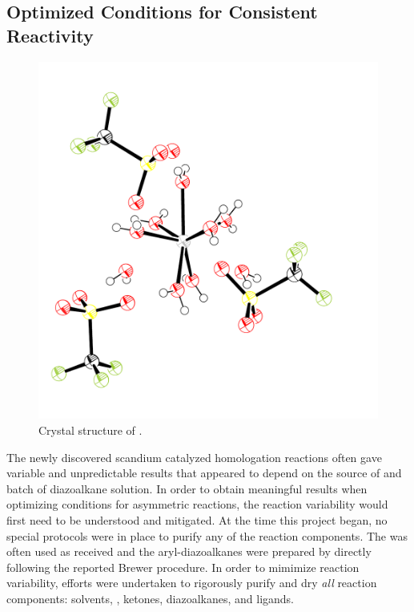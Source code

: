 \subsection{Optimized Conditions for Consistent Reactivity}

\begin{figure}
  \centering
  \vspace{-40pt}
  \includegraphics[scale=0.3]{chp_asymmetric/images/scandiumhydratedortep}
  \caption{Crystal structure of .}
  \vspace{-25pt}
  \label{fig:asscandiumhydrated}
  \end{figure}
The newly discovered scandium catalyzed homologation reactions often gave variable and
unpredictable results that appeared to depend on the source of  and batch of
diazoalkane solution.
In order to obtain meaningful results when optimizing conditions for asymmetric reactions, the reaction
variability would first need to be understood and mitigated. At the time this project began,
no special protocols were in place to purify any of the reaction components. The  was
often used as received and the aryl-diazoalkanes were prepared by directly following the
reported Brewer procedure. In order to mimimize reaction variability, efforts
were undertaken to rigorously purify and dry \textit{all} reaction components: solvents,
, ketones, diazoalkanes, and ligands.

